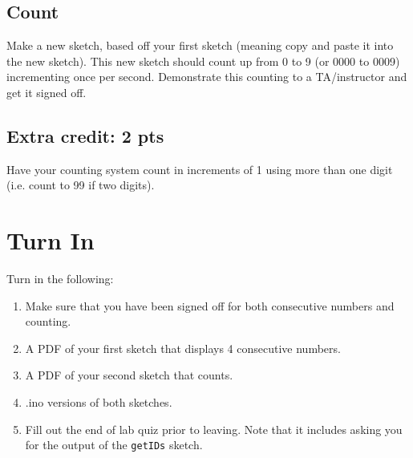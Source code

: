 \subsection{Count}
Make a new sketch, based off your first sketch (meaning copy and paste it into the new sketch).
This new sketch should count up from 0 to 9 (or 0000 to 0009) incrementing once per second. Demonstrate
this counting to a TA/instructor and get it signed off.

\subsection{Extra credit: 2 pts}
Have your counting system count in increments of 1 using more than one digit (i.e. count to 99 if two digits).

\section{Turn In}
Turn in the following:
\begin{enumerate}
    \item Make sure that you have been signed off for both consecutive numbers and counting.
    \item A PDF of your first sketch that displays 4 consecutive numbers.
    \item A PDF of your second sketch that counts.
    \item .ino versions of both sketches.
    \item Fill out the end of lab quiz prior to leaving. Note that it includes asking you 
            for the output of the \lstinline$getIDs$ sketch. 
\end{enumerate}